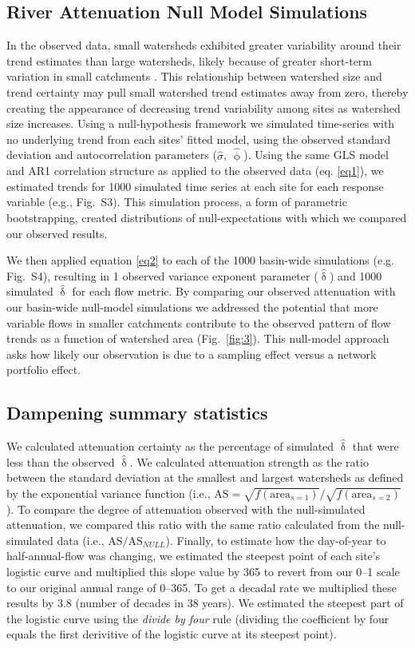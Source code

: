 \documentclass[9pt,twocolumn,twoside,lineno]{pnas-new}
\begin{document}
{\subsection*{River Attenuation Null Model Simulations} In the observed data, small watersheds exhibited greater variability around their trend estimates than large watersheds, likely because of greater short-term variation in small catchments \cite{Moore:2015}. This relationship between watershed size and trend certainty may pull small watershed trend estimates away from zero, thereby creating the appearance of decreasing trend variability among sites as watershed size increases. Using a null-hypothesis framework we simulated time-series with no underlying trend from each sites' fitted model, using the observed standard deviation and autocorrelation parameters ($\hat{\sigma}$, $\hat{\upphi}$). Using the same GLS model and AR1 correlation structure as applied to the observed data (eq. \ref{eq1}), we estimated trends for 1000 simulated time series at each site for each response variable (e.g., Fig.~S3). This simulation process, a form of parametric bootstrapping, created distributions of null-expectations with which we compared our observed results.

We then applied equation \ref{eq2} to each of the 1000 basin-wide simulations (e.g. Fig.~S4), resulting in 1 observed variance exponent parameter ($\hat{\updelta}$) and 1000 simulated $\hat{\updelta}$ for each flow metric. By comparing our observed attenuation with our basin-wide null-model simulations we addressed the potential that more variable flows in smaller catchments contribute to the observed pattern of flow trends as a function of watershed area (Fig.~\ref{fig:3}). This null-model approach asks how likely our observation is due to a sampling effect versus a network portfolio effect.

\subsection*{Dampening summary statistics} We calculated attenuation certainty as the percentage of simulated $\hat{\updelta}$ that were less than the observed $\hat{\updelta}$. We calculated attenuation strength as the ratio between the standard deviation at the smallest and largest watersheds as defined by the exponential variance function (i.e., $\mathrm{AS}=\sqrt{f(\mathrm{area}_{s=1})} / \sqrt{f(\mathrm{area}_{s=2})}$). To compare the degree of attenuation observed with the null-simulated attenuation, we compared this ratio with the same ratio calculated from the null-simulated data (i.e., $\mathrm{AS} / \mathrm{AS}_{NULL}$). Finally, to estimate how the day-of-year to half-annual-flow was changing, we estimated the steepest point of each site's logistic curve and multiplied this slope value by 365 to revert from our 0--1 scale to our original annual range of 0--365. To get a decadal rate we multiplied these results by 3.8 (number of decades in 38 years). We estimated the steepest part of the logistic curve using the \textit{divide by four} rule \cite{Gelman:2008} (dividing the coefficient by four equals the first derivitive of the logistic curve at its steepest point).

}
\end{document}
